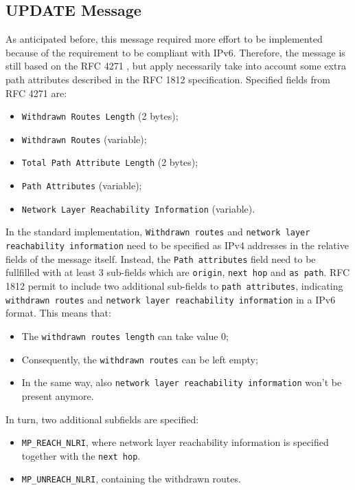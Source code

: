 \subsection{UPDATE Message}
As anticipated before, this message required more effort to be implemented because of the requirement to be compliant with IPv6.
Therefore, the message is still based on the RFC 4271 \cite{rfc4271}, but apply necessarily take into account some extra path attributes described in the RFC 1812 \cite{rfc1812} specification.
Specified fields from RFC 4271 are:
\begin{itemize}
 \item \texttt{Withdrawn Routes Length} (2 bytes);
 \item \texttt{Withdrawn Routes} (variable);
 \item \texttt{Total Path Attribute Length} (2 bytes);
 \item \texttt{Path Attributes} (variable);
 \item \texttt{Network Layer Reachability Information} (variable).
\end{itemize}
In the standard implementation, \texttt{Withdrawn routes} and \texttt{network layer reachability information} need to be specified as IPv4 addresses in the relative fields of the message itself. Instead, the \texttt{Path attributes} field need to be fullfilled with at least 3 sub-fields which are \texttt{origin}, \texttt{next hop} and \texttt{as path}.
RFC 1812 permit to include two additional sub-fields to \texttt{path attributes}, indicating \texttt{withdrawn routes} and \texttt{network layer reachability information} in a IPv6 format.
This means that:
\begin{itemize}
 \item The \texttt{withdrawn routes length} can take value 0;
 \item Consequently, the \texttt{withdrawn routes} can be left empty;
 \item In the same way, also \texttt{network layer reachability information} won't be present anymore.
\end{itemize}
In turn, two additional subfields are specified:
\begin{itemize}
 \item \texttt{MP\_REACH\_NLRI}, where network layer reachability information is specified together with the \texttt{next hop}.
 \item \texttt{MP\_UNREACH\_NLRI}, containing the withdrawn routes.
\end{itemize}

